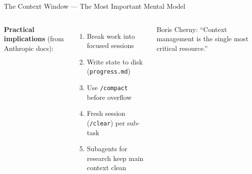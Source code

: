 \documentclass[aspectratio=169,10pt]{beamer}
\newcommand{\emphc}[1]{\textcolor{harvardcrimson}{#1}}
\begin{document}
\begin{frame}[fragile]{The Context Window --- The Most Important Mental Model}
\begin{columns}[T]
\vspace{0.2em}
\textbf{Practical implications} (from Anthropic docs):
\begin{enumerate}\itemsep0pt
    \item[\scriptsize 1.] Break work into \emphc{focused sessions}
    \item[\scriptsize 2.] Write state to disk (\texttt{progress.md})
    \item[\scriptsize 3.] Use \texttt{/compact} before overflow
    \item[\scriptsize 4.] Fresh session (\texttt{/clear}) per sub-task
    \item[\scriptsize 5.] \emphc{Subagents} for research keep main context clean
\end{enumerate}

\vspace{0.1em}
{\tiny Boris Cherny: ``Context management is the single most critical resource.''}
\end{columns}
\end{frame}
\end{document}

